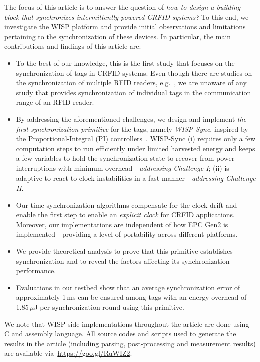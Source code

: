 \documentclass[10pt,journal,compsoc]{IEEEtran}
\begin{document}
The focus of this article is to answer the question of \emph{how to design a building block that synchronizes intermittently-powered CRFID systems?} To this end, we investigate the WISP platform and provide initial observations and limitations pertaining to the synchronization of these devices. In particular, the main contributions and findings of 
this article are:
%
\begin{itemize}
	\item To the best of our knowledge, this is the first study that focuses on the synchronization of tags in CRFID systems. Even though there are studies on the synchronization of multiple RFID readers, e.g.~\cite{reader_sync}, we are unaware of any study that provides synchronization of individual tags in the communication range of an RFID reader. 
	\item By addressing the aforementioned challenges, we design and implement \emph{the first synchronization primitive} for the tags, namely \emph{WISP-Sync}, inspired by the Proportional-Integral (PI) controllers~\cite{pi2015,yildirim2017adaptive}. WISP-Sync (i) 
	requires only a few computation steps to run efficiently under limited harvested energy and keeps a few variables to hold the synchronization state to recover from power interruptions with minimum overhead---\emph{addressing Challenge I}; (ii) is adaptive to react to clock instabilities in a fast manner---\emph{addressing Challenge II}.
	\item Our time synchronization algorithms compensate for the clock drift and enable the first step to enable an \emph{explicit clock} for CRFID applications. Moreover, our implementations are independent of how EPC Gen2 is implemented---providing a level of portability across different platforms.
	\item We provide theoretical analysis to prove that this primitive establishes synchronization and to reveal the factors affecting its synchronization performance.
	\item Evaluations in our testbed show that an average synchronization error of approximately 1\,ms can be ensured among tags with an energy overhead of 1.85\,$\mu$J per synchronization round using this  primitive.
\end{itemize}
%
We note that WISP-side implementations throughout the article are done using C and assembly language. All source codes and scripts used to generate the results in the article (including parsing, post-processing and measurement results) are available via~\url{https://goo.gl/RuWIZ2}.
\end{document}
